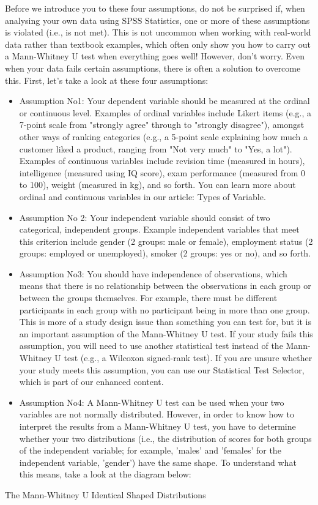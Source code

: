 \documentclass[]{article}
\begin{document}
Before we introduce you to these four assumptions, do not be surprised if, when analysing your own data using SPSS Statistics, one or more of these assumptions is violated (i.e., is not met). This is not uncommon when working with real-world data rather than textbook examples, which often only show you how to carry out a Mann-Whitney U test when everything goes well! However, don’t worry. Even when your data fails certain assumptions, there is often a solution to overcome this. First, let’s take a look at these four assumptions:
\begin{itemize}
\item Assumption No1: Your dependent variable should be measured at the ordinal or continuous level. Examples of ordinal variables include Likert items (e.g., a 7-point scale from "strongly agree" through to "strongly disagree"), amongst other ways of ranking categories (e.g., a 5-point scale explaining how much a customer liked a product, ranging from "Not very much" to "Yes, a lot"). Examples of continuous variables include revision time (measured in hours), intelligence (measured using IQ score), exam performance (measured from 0 to 100), weight (measured in kg), and so forth. You can learn more about ordinal and continuous variables in our article: Types of Variable.
\item Assumption No 2: Your independent variable should consist of two categorical, independent groups. Example independent variables that meet this criterion include gender (2 groups: male or female), employment status (2 groups: employed or unemployed), smoker (2 groups: yes or no), and so forth.
\item Assumption No3: You should have independence of observations, which means that there is no relationship between the observations in each group or between the groups themselves. For example, there must be different participants in each group with no participant being in more than one group. This is more of a study design issue than something you can test for, but it is an important assumption of the Mann-Whitney U test. If your study fails this assumption, you will need to use another statistical test instead of the Mann-Whitney U test (e.g., a Wilcoxon signed-rank test). If you are unsure whether your study meets this assumption, you can use our Statistical Test Selector, which is part of our enhanced content.
\item Assumption No4: A Mann-Whitney U test can be used when your two variables are not normally distributed. However, in order to know how to interpret the results from a Mann-Whitney U test, you have to determine whether your two distributions (i.e., the distribution of scores for both groups of the independent variable; for example, 'males' and 'females' for the independent variable, 'gender') have the same shape. To understand what this means, take a look at the diagram below:
\end{itemize}
The Mann-Whitney U Identical Shaped Distributions
\end{document}
